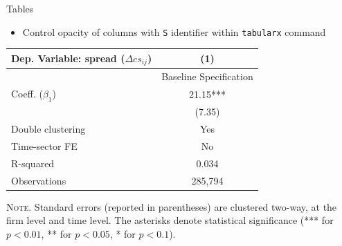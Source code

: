 \documentclass[10pt]{beamer}
\begin{document}

\begin{frame}
	{Tables}
	\begin{itemize}
		\item Control opacity of columns with \texttt{S} identifier within \texttt{tabularx} command 
	\end{itemize}
	\begin{table}[th]
		\centering%
		\begin{minipage}[b]{.5\textwidth}
			\vspace{.2cm}\tablesize
			\begin{tabularx}{\textwidth}{lS}
				\toprule
				Dep. Variable: spread ($\Delta cs_{ij}$) 	& (1)\\
				\midrule
				& {Baseline Specification} \\
				\midrule
				 Coeff. ($\beta_1$) 		&  21.15*** \\
				&   (7.35) \\
				\midrule
				 Double clustering 		& Yes \\
				Time-sector FE 												& No \\
				 R-squared 					& 0.034 \\
				Observations 												& 285,794 \\\bottomrule
			\end{tabularx}\vspace{.2cm}\newline
			\tiny{{\scshape Note.} Standard errors (reported in parentheses) are clustered two-way, at the firm level and time level. The asterisks denote statistical significance (*** for $p<0.01$, ** for $p<0.05$, * for $p<0.1$).\newline}%
			\label{tab:label}%
		\end{minipage}
	\end{table}
\end{frame}

\end{document}
